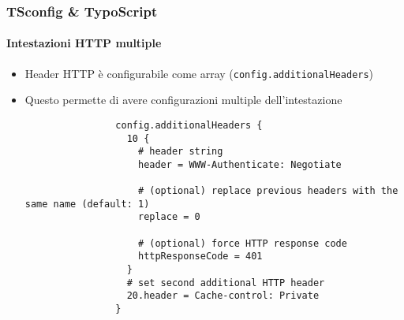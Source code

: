 
\begin{frame}[fragile]
	\frametitle{TSconfig \& TypoScript}
	\framesubtitle{Intestazioni HTTP multiple}

	\begin{itemize}

		\item Header HTTP è configurabile come array (\small\texttt{config.additionalHeaders}\normalsize)
		\item Questo permette di avere configurazioni multiple dell'intestazione

			\begin{lstlisting}
				config.additionalHeaders {
				  10 {
				    # header string
				    header = WWW-Authenticate: Negotiate

				    # (optional) replace previous headers with the same name (default: 1)
				    replace = 0

				    # (optional) force HTTP response code
				    httpResponseCode = 401
				  }
				  # set second additional HTTP header
				  20.header = Cache-control: Private
				}
			\end{lstlisting}

	\end{itemize}

\end{frame}


